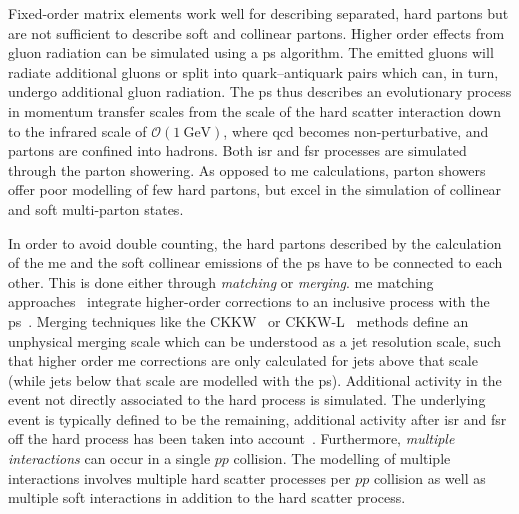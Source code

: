 Fixed-order matrix elements work well for describing separated, hard partons but are not sufficient to describe soft and collinear partons. Higher order effects from gluon radiation can be simulated using a \gls{ps} algorithm. The emitted gluons will radiate additional gluons or split into quark--antiquark pairs which can, in turn, undergo additional gluon radiation. The \gls{ps}  thus describes an evolutionary process in momentum transfer scales from the scale of the hard scatter interaction down to the infrared scale of $\mathcal{O}(\SI{1}{\GeV})$, where \gls{qcd} becomes non-perturbative, and partons are confined into hadrons. Both \gls{isr} and \gls{fsr} processes are simulated through the parton showering. As opposed to \gls{me} calculations, parton showers offer poor modelling of few hard partons, but excel in the simulation of collinear and soft multi-parton states.

In order to avoid double counting, the hard partons described by the calculation of the \gls{me} and the soft collinear emissions of the \gls{ps} have to be connected to each other. This is done either through \textit{matching} or \textit{merging}. \gls{me} matching approaches~\cite{Bengtsson:1986hr} integrate higher-order corrections to an inclusive process with the \gls{ps}~\cite{Buckley:2011ms}.
Merging techniques like the CKKW~\cite{Catani:2001cc} or CKKW-L~\cite{Lonnblad:2001iq} methods define an unphysical merging scale which can be understood as a jet resolution scale, such that higher order \gls{me} corrections are only calculated for jets above that scale (while jets below that scale are modelled with the \gls{ps}).
Additional activity in the event not directly associated to the hard process is simulated. The underlying event is typically defined to be the remaining, additional activity after \gls{isr} and \gls{fsr} off the hard process has been taken into account~\cite{Buckley:2011ms}. Furthermore, \textit{multiple interactions} can occur in a single $pp$ collision. The modelling of multiple interactions involves multiple hard scatter processes per $pp$ collision as well as multiple soft interactions in addition to the hard scatter process.

